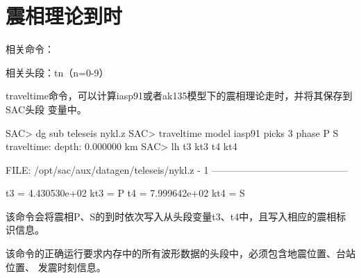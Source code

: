 \section{震相理论到时}
相关命令：

相关头段：tn（n=0-9）

traveltime命令，可以计算iasp91或者ak135模型下的震相理论走时，并将其保存到SAC头段
变量中。

\begin{SACCode}
SAC> dg sub teleseis nykl.z
SAC> traveltime model iasp91 picks 3 phase P S 
traveltime: depth: 0.000000 km
SAC> lh t3 kt3 t4 kt4
  
  FILE: /opt/sac/aux/datagen/teleseis/nykl.z - 1
   ------------------------------------------

         t3 = 4.430530e+02
        kt3 = P
         t4 = 7.999642e+02
        kt4 = S
\end{SACCode}

该命令会将震相P、S的到时依次写入从头段变量t3、t4中，且写入相应的震相标识信息。

\begin{Tips}
该命令的正确运行要求内存中的所有波形数据的头段中，必须包含地震位置、台站位置、
发震时刻信息。
\end{Tips}

